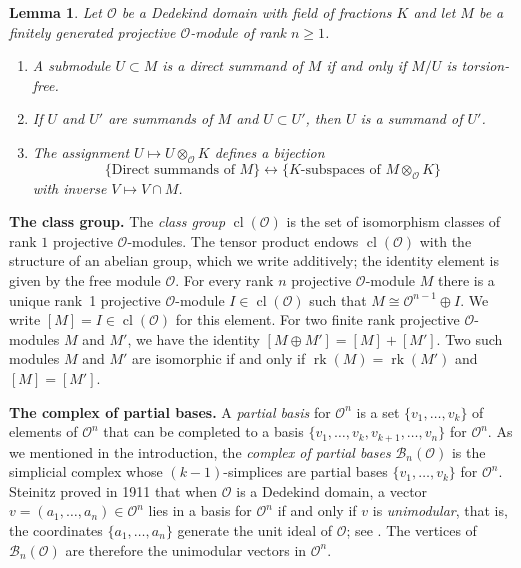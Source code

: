 \documentclass[11 pt]{article}
\theoremstyle{plain}
\newtheorem{lemma}[theorem]{Lemma}
\theoremstyle{definition}
\numberwithin{equation}{section}
\newcommand{\para}[1]{\bigskip\noindent\textbf{#1.}}
\newcommand{\paranoskip}[1]{\noindent\textbf{#1.}}
\renewcommand{\O}{\mathcal{O}}
\newcommand\PartialBases{\ensuremath{\mathcal{B}}}
\newcommand{\PB}{\PartialBases}
\DeclareMathOperator{\class}{cl}
\newcommand{\cl}{\class}
\newcommand\tensor{\otimes}
\DeclareMathOperator{\Rank}{rk}
\newcommand\iso{\cong}
\begin{document}
\begin{lemma}
\label{lemma:summandsubspace}
Let $\O$ be a Dedekind domain with field of fractions $K$ and let $M$ be a finitely generated
projective $\O$-module of rank $n \geq 1$.
\begin{enumerate}[label={\normalfont (\alph*)},topsep=2pt,itemsep=1pt,parsep=1pt]
\item A submodule $U\subset M$ is a direct summand of $M$ if and only if $M/U$ is torsion-free.
\item If $U$ and $U'$ are summands of $M$ and $U\subset U'$, then $U$ is a summand of $U'$.
\item The assignment $U\mapsto U\tensor_\O K$ defines a bijection
\[\{\text{Direct summands of $M$}\} \longleftrightarrow \{\text{$K$-subspaces of $M\tensor_\O K$}\}\]
with inverse $V\mapsto V\cap M$.
\end{enumerate}
\end{lemma}

\paranoskip{The class group}
The \emph{class group} $\class(\O)$ is the
set of isomorphism classes of rank $1$ projective $\O$-modules.  The tensor product endows $\class(\O)$ with the structure 
of an abelian group, which we write additively; the identity element is given by the free module $\O$.
For every rank $n$ projective $\O$-module $M$ there is a unique rank~1 projective $\O$-module $I\in \cl(\O)$ such 
that $M\iso \O^{n-1}\oplus I$.  We write $[M] = I\in \cl(\O)$ for this element.  For two finite rank 
projective $\O$-modules $M$ and $M'$, we have the identity $[M \oplus M'] = [M] + [M']$.  Two such 
modules $M$ and $M'$ are isomorphic if and only if $\Rank(M)=\Rank(M')$ and $[M]=[M']$.

\para{The complex of partial bases}
A \emph{partial basis} for $\O^n$ is a set $\{v_1,\ldots,v_k\}$ of elements of $\O^n$ that can be completed to a basis
$\{v_1,\ldots,v_k,v_{k+1},\ldots,v_n\}$ for $\O^n$.
As we mentioned in the introduction, the \emph{complex of partial bases} 
$\PartialBases_n(\O)$ is the simplicial
complex whose $(k-1)$-simplices are partial bases $\{v_1,\ldots,v_k\}$ for $\O^n$.
Steinitz proved in 1911 that when $\O$ is a Dedekind domain, a vector $v=(a_1,\ldots,a_n) \in \O^n$ lies 
in a basis for $\O^n$ if and only if $v$ is \emph{unimodular}, that is, the  coordinates $\{a_1,\ldots,a_n\}$ generate the 
unit ideal of $\O$; see \cite{ReinerUnimodular}.  The vertices of $\PB_n(\O)$ are therefore
the unimodular vectors in $\O^n$.
\end{document}
